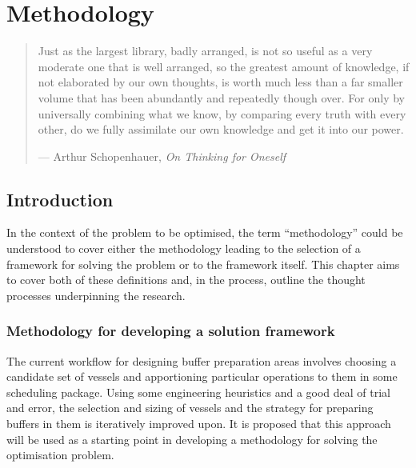 %
%
%
%

\chapter{Methodology}\label{C.methodology}

\begin{quote}
Just as the largest library, badly arranged, is not so useful as a very moderate
one that is well arranged, so the greatest amount of knowledge, if not
elaborated by our own thoughts, is worth much less than a far smaller volume
that has been abundantly and repeatedly though over.  For only by universally
combining what we know, by comparing every truth with every other, do we fully
assimilate our own knowledge and get it into our power.

\hspace{2cm}--- Arthur Schopenhauer, \emph{On Thinking for Oneself}
\end{quote}

\section{Introduction}\label{S.intro4}

In the context of the problem to be optimised, the term ``methodology'' could be
understood to cover either the methodology leading to the selection of a 
framework for solving the problem or to the framework itself.  This chapter
aims to cover both of these definitions and, in the process, outline the thought
processes underpinning the research.

\subsection{Methodology for developing a solution framework}\label{SS.method1}

The current workflow for designing buffer preparation areas involves choosing a
candidate set of vessels and apportioning particular operations to them in 
some scheduling package.  Using some engineering heuristics and a good deal of
trial and error, the selection and sizing of vessels and the strategy for
preparing buffers in them is iteratively improved upon.
It is proposed that this approach will be used as a starting point in developing
a methodology for solving the optimisation problem.

